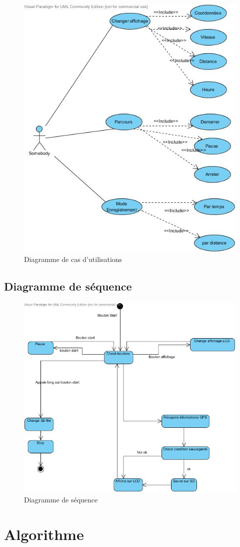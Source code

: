 \documentclass[a4paper,12pt,titlepage]{article}
\begin{document}
\begin{figure}[H]
	\centering
	\includegraphics[width=\textwidth]{use_case.jpg}
	\caption{Diagramme de cas d'utilisations}
	\label{usecase}
\end{figure}

\subsection{Diagramme de séquence}

\begin{figure}[H]
	\centering
	\includegraphics[width=\textwidth]{sequence.jpg}
	\caption{Diagramme de séquence}
	\label{sequence}
\end{figure}

\section{Algorithme}
\end{document}
